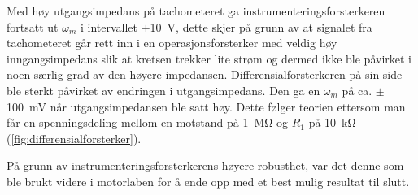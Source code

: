 Med høy utgangsimpedans på tachometeret ga instrumenteringsforsterkeren fortsatt ut $\omega_m$ i intervallet $\pm${\SI{10}{\volt}}, dette skjer på grunn av at signalet fra tachometeret går rett inn i en operasjonsforsterker med veldig høy inngangsimpedans slik at kretsen trekker lite strøm og dermed ikke ble påvirket i noen særlig grad av den høyere impedansen. 
Differensialforsterkeren på sin side ble sterkt påvirket av endringen i utgangsimpedans. Den ga en $\omega_m$ på ca. $\pm${\SI{100}{\milli\volt}} når utgangsimpedansen ble satt høy. Dette følger teorien ettersom man får en spenningsdeling mellom en motstand på {\SI{1}{\mega\ohm}} og $R_1$ på {\SI{10}{\kilo\ohm}} (\autoref{fig:differensialforsterker}).

På grunn av instrumenteringsforsterkerens høyere robusthet, var det denne som ble brukt videre i motorlaben for å ende opp med et best mulig resultat til slutt.

